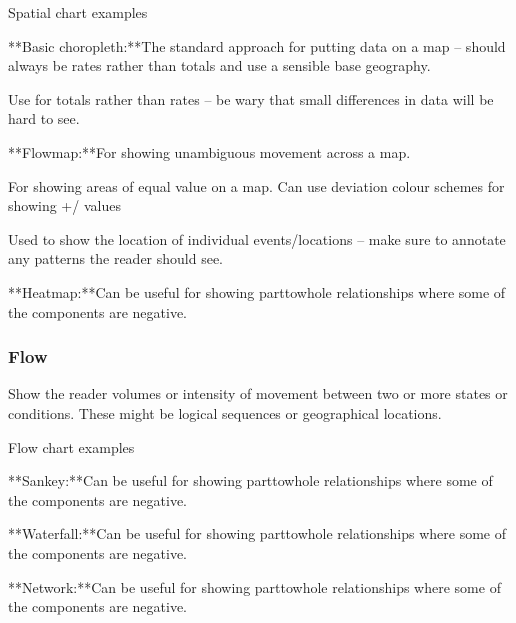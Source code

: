 \documentclass[letterpaper,10pt,english]{jupyterBook}
\begin{document}
\sphinxAtStartPar
{}

\sphinxAtStartPar
Spatial chart examples

\sphinxAtStartPar
{}**Basic choropleth:**The standard approach for putting data on a map – should always be rates rather than totals and use a sensible base geography.

\sphinxAtStartPar
{} Use for totals rather than rates – be wary that small differences in data will be hard to see.

\sphinxAtStartPar
{}**Flowmap:**For showing unambiguous movement across a map.

\sphinxAtStartPar
{} For showing areas of equal value on a map. Can use deviation colour schemes for showing +/\sphinxhyphen{} values

\sphinxAtStartPar
{} Used to show the location of individual events/locations – make sure to annotate any patterns the reader should see.

\sphinxAtStartPar
{}**Heatmap:**Can be useful for showing part\sphinxhyphen{}to\sphinxhyphen{}whole relationships where some of the components are negative.


\subsubsection{Flow}
\label{\detokenize{part1/communication:flow}}
\sphinxAtStartPar
Show the reader volumes or intensity of movement between two or more states or conditions. These might be logical sequences or geographical locations.

\sphinxAtStartPar
{}

\sphinxAtStartPar
Flow chart examples

\sphinxAtStartPar
{}**Sankey:**Can be useful for showing part\sphinxhyphen{}to\sphinxhyphen{}whole relationships where some of the components are negative.

\sphinxAtStartPar
{}**Waterfall:**Can be useful for showing part\sphinxhyphen{}to\sphinxhyphen{}whole relationships where some of the components are negative.

\sphinxAtStartPar
{}**Network:**Can be useful for showing part\sphinxhyphen{}to\sphinxhyphen{}whole relationships where some of the components are negative.
\end{document}
